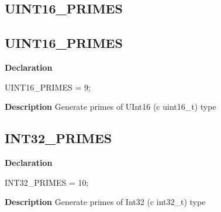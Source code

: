 \documentclass{report}
\newif\ifpdf
\begin{document}
\subsection*{\large{\textbf{UINT16{\_}PRIMES}}\normalsize\hspace{1ex}\hrulefill}
\else
\subsection*{UINT16{\_}PRIMES}
\fi
\label{primesieve-UINT16_PRIMES}
\begin{list}{}{
\setlength{\itemindent}{0cm}
\setlength{\listparindent}{0cm}
\setlength{\leftmargin}{\evensidemargin}
\addtolength{\leftmargin}{\tmplength}
\settowidth{\labelsep}{X}
\addtolength{\leftmargin}{\labelsep}
\setlength{\labelwidth}{\tmplength}
}
\item[\textbf{Declaration}\hfill]
\ifpdf
\begin{flushleft}
\fi
\begin{ttfamily}
UINT16{\_}PRIMES = 9;\end{ttfamily}

\ifpdf
\end{flushleft}
\fi

\par
\item[\textbf{Description}]
Generate primes of UInt16 (c uint16{\_}t) type

\end{list}
\ifpdf
\subsection*{\large{\textbf{INT32{\_}PRIMES}}\normalsize\hspace{1ex}\hrulefill}
\else
\subsection*{INT32{\_}PRIMES}
\fi
\label{primesieve-INT32_PRIMES}
\begin{list}{}{
\setlength{\itemindent}{0cm}
\setlength{\listparindent}{0cm}
\setlength{\leftmargin}{\evensidemargin}
\addtolength{\leftmargin}{\tmplength}
\settowidth{\labelsep}{X}
\addtolength{\leftmargin}{\labelsep}
\setlength{\labelwidth}{\tmplength}
}
\item[\textbf{Declaration}\hfill]
\ifpdf
\begin{flushleft}
\fi
\begin{ttfamily}
INT32{\_}PRIMES = 10;\end{ttfamily}

\ifpdf
\end{flushleft}
\fi

\par
\item[\textbf{Description}]
Generate primes of Int32 (c int32{\_}t) type

\end{list}
\ifpdf
\end{document}
